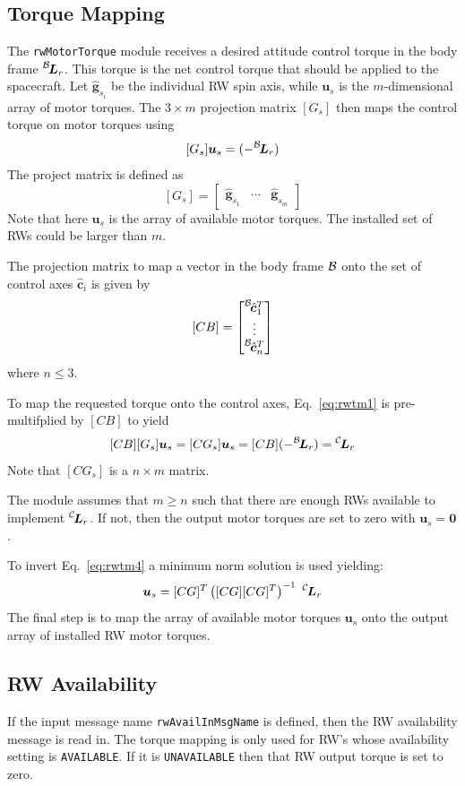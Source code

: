 \subsection{Torque Mapping}
The {\tt rwMotorTorque} module receives a desired attitude control torque in the body frame $\leftexp{B}{\bm L}_r$.  This torque is the net control torque that should be applied to the spacecraft. Let $\hat{\bm g}_{s_{i}}$ be the individual RW spin axis, while $\bm u_{s}$ is the $m$-dimensional array of motor torques.  The $3\times m$ projection matrix $[G_{s}]$ then maps the control torque on motor torques using
\begin{equation}
	\label{eq:rwtm1}
	[G_{s}] \bm u_{s} = (-\leftexp{B}{\bm L}_r)
\end{equation}
The project matrix is defined as
\begin{equation}
	\label{eq:rwtm2}
	[G_{s}] = \begin{bmatrix}
		\hat{\bm g}_{s_{1}} & \cdots & \hat{\bm g}_{s_{m}}
	\end{bmatrix}
\end{equation}
Note that here $\bm u_{s}$ is the array of available motor torques.  The installed set of RWs could be larger than $m$.  

The projection matrix to map a vector in the body frame $\cal B$ onto the set of control axes $\hat{\bm c}_{i}$ is given by
\begin{equation}
	\label{eq:rwtm3}
	[CB] = \begin{bmatrix}
		\leftexp{B}{\hat{\bm c}}_{1}^{T}
		\\
		\vdots \\
		\leftexp{B}{\hat{\bm c}}_{n}^{T}
	\end{bmatrix}
\end{equation}
where $n \le 3$.  

To map the requested torque onto the control axes, Eq.~\eqref{eq:rwtm1} is pre-multifplied by $[CB]$ to yield
\begin{equation}
	\label{eq:rwtm4}
	[CB][G_{s}] \bm u_{s} = [CG_{s}] \bm u_{s} = [CB](-\leftexp{B}{\bm L}_r) = \leftexp{C}{\bm L}_{r}
\end{equation}
Note that $[CG_{s}]$ is a $n\times m$ matrix.  

The module assumes that $m\ge n$ such that there are enough RWs available to implement $ \leftexp{C}{\bm L}_{r}$.  If not, then the output motor torques are set to zero with $\bm u_{s} = \bm 0$.  

To invert Eq.~\eqref{eq:rwtm4} a minimum norm solution is used yielding: 
\begin{equation}
 \bm u_{s}  = [CG]^T \left([CG][CG]^T\right)^{-1}\  \leftexp{C}{\bm L}_{r}
\end{equation}
The final step is to map the array of available motor torques $\bm u_{s}$ onto the output array of installed RW motor torques.  


\subsection{RW Availability} 
If the input message name {\tt rwAvailInMsgName} is defined, then the RW availability message is read in. The torque mapping is only used for RW's whose availability setting is {\tt AVAILABLE}.  If it is {\tt UNAVAILABLE} then that RW output torque is set to zero.  


